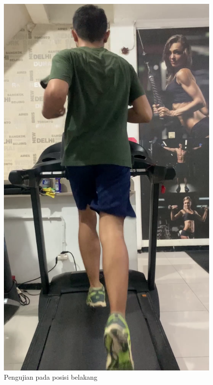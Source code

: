 \begin{figure}[H]
  \centering
  \includegraphics[scale=0.45]{gambar/posisi_belakang.png}
  \caption{Pengujian pada posisi belakang}
  \label{fig:PengujianPosisiBelakang}
\end{figure}

